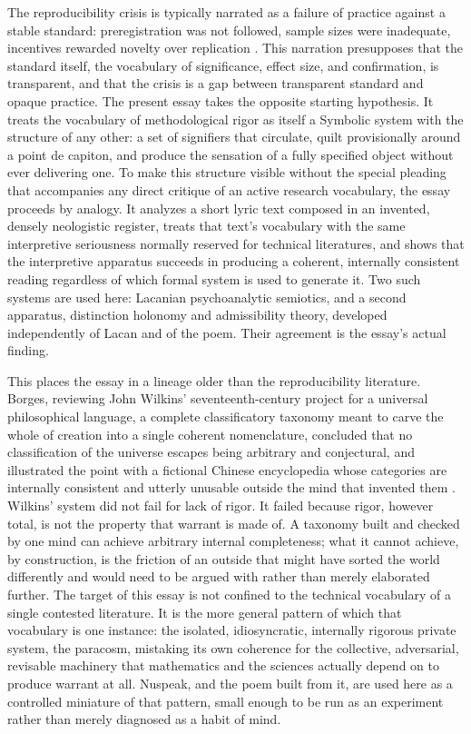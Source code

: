 \documentclass[11pt]{article}
\begin{document}
The reproducibility crisis is typically narrated as a failure of practice against a stable standard: preregistration was not followed, sample sizes were inadequate, incentives rewarded novelty over replication \cite{ioannidis, osc}. This narration presupposes that the standard itself, the vocabulary of significance, effect size, and confirmation, is transparent, and that the crisis is a gap between transparent standard and opaque practice. The present essay takes the opposite starting hypothesis. It treats the vocabulary of methodological rigor as itself a Symbolic system with the structure of any other: a set of signifiers that circulate, quilt provisionally around a point de capiton, and produce the sensation of a fully specified object without ever delivering one. To make this structure visible without the special pleading that accompanies any direct critique of an active research vocabulary, the essay proceeds by analogy. It analyzes a short lyric text composed in an invented, densely neologistic register, treats that text's vocabulary with the same interpretive seriousness normally reserved for technical literatures, and shows that the interpretive apparatus succeeds in producing a coherent, internally consistent reading regardless of which formal system is used to generate it. Two such systems are used here: Lacanian psychoanalytic semiotics, and a second apparatus, distinction holonomy and admissibility theory, developed independently of Lacan and of the poem. Their agreement is the essay's actual finding.

This places the essay in a lineage older than the reproducibility literature. Borges, reviewing John Wilkins' seventeenth-century project for a universal philosophical language, a complete classificatory taxonomy meant to carve the whole of creation into a single coherent nomenclature, concluded that no classification of the universe escapes being arbitrary and conjectural, and illustrated the point with a fictional Chinese encyclopedia whose categories are internally consistent and utterly unusable outside the mind that invented them \cite{borges}. Wilkins' system did not fail for lack of rigor. It failed because rigor, however total, is not the property that warrant is made of. A taxonomy built and checked by one mind can achieve arbitrary internal completeness; what it cannot achieve, by construction, is the friction of an outside that might have sorted the world differently and would need to be argued with rather than merely elaborated further. The target of this essay is not confined to the technical vocabulary of a single contested literature. It is the more general pattern of which that vocabulary is one instance: the isolated, idiosyncratic, internally rigorous private system, the paracosm, mistaking its own coherence for the collective, adversarial, revisable machinery that mathematics and the sciences actually depend on to produce warrant at all. Nuspeak, and the poem built from it, are used here as a controlled miniature of that pattern, small enough to be run as an experiment rather than merely diagnosed as a habit of mind.
\end{document}
